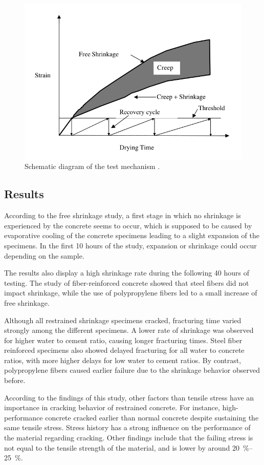 \documentclass[a4paper,11pt]{memoir}
\begin{document}
\begin{figure}
  \centering
  \includegraphics[width=.5\linewidth]{aci1}
  \caption{Schematic diagram of the test mechanism \cite{cscea}.}\label{aci1}
\end{figure}

\subsection{Results}
According to the free shrinkage study, a first stage in which no shrinkage is
experienced by the concrete seems to occur, which is supposed to be caused by
evaporative cooling of the concrete specimens leading to a slight expansion of
the specimens. In the first 10 hours of the study, expansion or shrinkage could
occur depending on the sample.

The results also display a high shrinkage rate during the following 40 hours of
testing. The study of fiber-reinforced concrete showed that steel fibers did
not impact shrinkage, while the use of polypropylene fibers led to a small
increase of free shrinkage.

Although all restrained shrinkage specimens cracked, fracturing time varied
strongly among the different specimens. A lower rate of shrinkage was observed
for higher water to cement ratio, causing longer fracturing times. Steel
fiber reinforced specimens also showed delayed fracturing for all water to
concrete ratios, with more higher delays for low water to cement ratios. By
contrast, polypropylene fibers caused earlier failure due to the shrinkage
behavior observed before.

According to the findings of this study, other factors than tensile stress have
an importance in cracking behavior of restrained concrete. For instance,
high-performance concrete cracked earlier than normal concrete despite
sustaining the same tensile stress. Stress history has a strong influence on
the performance of the material regarding cracking. Other findings include that
the failing stress is not equal to the tensile strength of the material, and is
lower by around \SIrange{20}{25}{\percent}.
\end{document}
